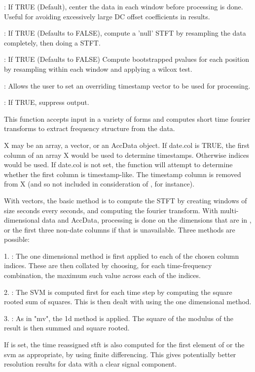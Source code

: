 \documentclass[a4paper]{book}
\begin{document}
\begin{Arguments}
\begin{ldescription}
: If TRUE (Default), center the data in each window before processing is done. Useful for avoiding excessively large DC offset coefficients in results.\\{}

: If TRUE (Defaults to FALSE), compute a 'null' STFT by resampling the data completely, then doing a STFT.\\{}

: If TRUE (Defaults to FALSE) Compute bootstrapped pvalues for each position by resampling within each window and applying a wilcox test.\\{}

: Allows the user to set an overriding timestamp vector to be used for processing.\\{}

: If TRUE, suppress output.

\end{ldescription}
\end{Arguments}
%
\begin{Details}\relax
This function accepts input in a variety of forms and computes short time fourier transforms to extract frequency structure from the data.

X may be an array, a vector, or an AccData object. If date.col is TRUE, the first column of an array X would be used to determine timestamps. Otherwise indices would be used. If date.col is not set, the function will attempt to determine whether the first column is timestamp-like. The timestamp column is removed from X (and so not included in consideration of , for instance).

With vectors, the basic method is to compute the STFT by creating windows of size  seconds every  seconds, and computing the fourier transform. With multi-dimensional data and AccData, processing is done on the dimensions that are in , or the first three non-date columns if that is unavailable. Three methods are possible:

1. : The one dimensional method is first applied to each of the chosen column indices. These are then collated by choosing, for each time-frequency combination, the maximum such value across each of the indices.

2. : The SVM is computed first for each time step by computing the square rooted sum of squares. This is then dealt with using the one dimensional method.

3. : As in "mv", the 1d method is applied. The square of the modulus of the result is then summed and square rooted.

If  is set, the time reassigned stft is also computed for the first element of  or the svm as appropriate, by using finite differencing. This gives potentially better resolution results for data with a clear signal component.
\end{Details}
\end{document}
